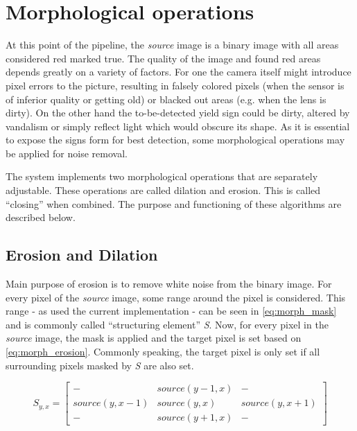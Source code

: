 \documentclass{report}
\begin{document}
{}


\section{Morphological operations}
\label{sec:morph}

At this point of the pipeline, the \textit{source} image is a binary
image with all areas considered red marked true. The quality of the
image and found red areas depends greatly on a variety of factors. For
one the camera itself might introduce pixel errors to the picture,
resulting in falsely colored pixels (when the sensor is of inferior
quality or getting old) or blacked out areas (e.g. when the lens is
dirty). On the other hand the to-be-detected yield sign could be
dirty, altered by vandalism or simply reflect light which would
obscure its shape. As it is essential to expose the signs form for
best detection, some morphological operations may be applied for noise
removal.

The system implements two morphological operations that are separately
adjustable. These operations are called dilation and erosion. This is
called ``closing'' when combined. The purpose and functioning of these
algorithms are described below.


\subsection{Erosion and Dilation}

Main purpose of erosion is to remove white noise from the binary
image. For every pixel of the \textit{source} image, some range around
the pixel is considered. This range - as used the current
implementation - can be seen in \ref{eq:morph_mask} and is commonly
called ``structuring element'' \textit{S}. Now, for every pixel in the
\textit{source} image, the mask is applied and the target pixel is set
based on \ref{eq:morph_erosion}. Commonly speaking, the target pixel
is only set if all surrounding pixels masked by \textit{S} are also
set.

\begin{equation}\label{eq:morph_mask}
  S_{y, x} = \begin{bmatrix}

    -              & source(y-1, x) & -              \\
    source(y, x-1) & source(y, x)   & source(y, x+1) \\
    -              & source(y+1, x) & -

  \end{bmatrix}
\end{equation}
\end{document}
